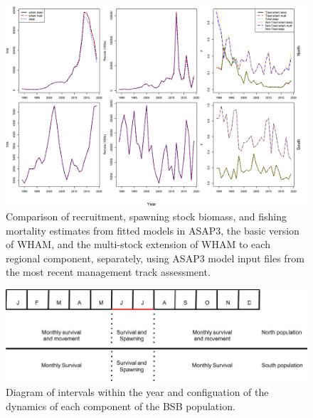 \documentclass[
]{article}
\newcommand{\blandscape}{\begin{landscape}}
\newcommand{\elandscape}{\end{landscape}}
\begin{document}
\blandscape
\begin{figure}

{\centering \includegraphics[width=0.75\linewidth]{plots/compare_one_stock_models} 

}

\caption{Comparison of recruitment, spawning stock biomass, and fishing mortality estimates from fitted models in ASAP3, the basic version of WHAM, and the multi-stock extension of WHAM to each regional component, separately, using ASAP3 model input files from the most recent management track assessment.}\label{fig:compare-asap-wham}
\end{figure}

\begin{figure}

{\centering \includegraphics[width=0.8\linewidth]{plots/migration_diagram_1} 

}

\caption{Diagram of intervals within the year and configuation of the dynamics of each component of the BSB population.}\label{fig:unnamed-chunk-2}
\end{figure}
\elandscape
\end{document}
